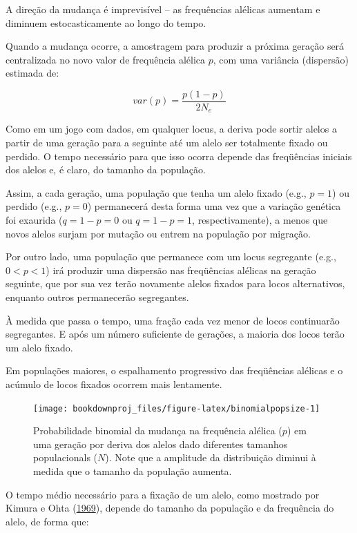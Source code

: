 \documentclass[
]{book}
\begin{document}
A direção da mudança é imprevisível -- as frequências alélicas aumentam e diminuem estocasticamente ao longo do tempo.

Quando a mudança ocorre, a amostragem para produzir a próxima geração será centralizada no novo valor de frequência alélica \(p\), com uma variância (dispersão) estimada de:

\[var(p) = \frac{p \left( 1-p \right)}{2N_e}\]

Como em um jogo com dados, em qualquer locus, a deriva pode sortir alelos a partir de uma geração para a seguinte até um alelo ser totalmente fixado ou perdido. O tempo necessário para que isso ocorra depende das freqüências iniciais dos alelos e, é claro, do tamanho da população.

Assim, a cada geração, uma população que tenha um alelo fixado (e.g., \(p=1\)) ou perdido (e.g., \(p=0\)) permanecerá desta forma uma vez que a variação genética foi exaurida (\(q = 1-p = 0\) ou \(q = 1-p = 1\), respectivamente), a menos que novos alelos surjam por mutação ou entrem na população por migração.

Por outro lado, uma população que permanece com um locus segregante (e.g., \(0<p<1\)) irá produzir uma dispersão nas freqüências alélicas na geração seguinte, que por sua vez terão novamente alelos fixados para locos alternativos, enquanto outros permanecerão segregantes.

À medida que passa o tempo, uma fração cada vez menor de locos continuarão segregantes. E após um número suficiente de gerações, a maioria dos locos terão um alelo fixado.

Em populações maiores, o espalhamento progressivo das freqüências alélicas e o acúmulo de locos fixados ocorrem mais lentamente.

\begin{figure}

{\centering \texttt{[image: bookdownproj\_files/figure-latex/binomialpopsize-1]} 

}

\caption{Probabilidade binomial da mudança na frequência alélica ($p$) em uma geração por deriva dos alelos dado diferentes tamanhos populacionals ($N$). Note que a amplitude da distribuição diminui à medida que o tamanho da população aumenta.}\label{fig:binomialpopsize}
\end{figure}

O tempo médio necessário para a fixação de um alelo, como mostrado por Kimura e Ohta (\href{https://doi.org/10.1093\%2Fgenetics\%2F61.3.763}{1969}), depende do tamanho da população e da frequência do alelo, de forma que:
\end{document}
